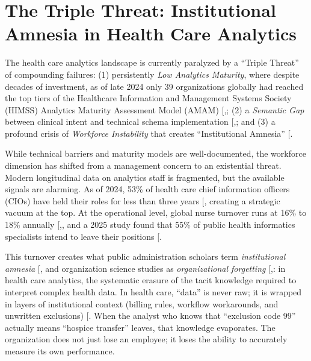 \documentclass[
  american,
  11pt,
  letterpaper,
  oneside  ,captions=tableheading
]{scrartcl}
\begin{document}
\section{The Triple Threat: Institutional Amnesia in Health Care
Analytics}\label{the-triple-threat-institutional-amnesia-in-health-care-analytics}

The health care analytics landscape is currently paralyzed by a ``Triple
Threat'' of compounding failures: (1) persistently \emph{Low Analytics
Maturity}, where despite decades of investment, as of late 2024 only 39
organizations globally had reached the top tiers of the Healthcare
Information and Management Systems Society (HIMSS) Analytics Maturity
Assessment Model (AMAM)
{[},\citeproc{ref-himss2024news}{2}{]}; (2) a
\emph{Semantic Gap} between clinical intent and technical schema
implementation
{[},\citeproc{ref-zhang2024}{4}{]}; and (3) a
profound crisis of \emph{Workforce Instability} that creates
``Institutional Amnesia'' {[}\citeproc{ref-hong2025}{5}{]}.

While technical barriers and maturity models are well-documented, the
workforce dimension has shifted from a management concern to an
existential threat. Modern longitudinal data on analytics staff is
fragmented, but the available signals are alarming. As of 2024, 53\% of
health care chief information officers (CIOs) have held their roles for
less than three years {[}\citeproc{ref-wittkieffer2024}{6}{]}, creating
a strategic vacuum at the top. At the operational level, global nurse
turnover runs at 16\% to 18\% annually
{[},\citeproc{ref-wu2024}{8}{]}, and a 2025
study found that 55\% of public health informatics specialists intend to
leave their positions {[}\citeproc{ref-rajamani2025}{9}{]}.

This turnover creates what public administration scholars term
\emph{institutional amnesia}
{[},\citeproc{ref-stark2019}{11}{]} and
organization science studies as \emph{organizational forgetting}
{[},\citeproc{ref-rao2006}{13}{]}: in
health care analytics, the systematic erasure of the tacit knowledge
required to interpret complex health data. In health care, ``data'' is
never raw; it is wrapped in layers of institutional context (billing
rules, workflow workarounds, and unwritten exclusions)
{[}\citeproc{ref-gitelman2013}{14}{]}. When the analyst who knows that
``exclusion code 99'' actually means ``hospice transfer'' leaves, that
knowledge evaporates. The organization does not just lose an employee;
it loses the ability to accurately measure its own performance.
\end{document}
